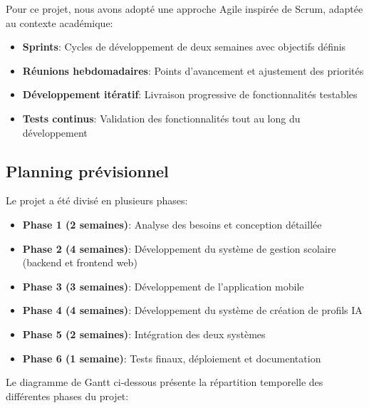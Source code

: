 Pour ce projet, nous avons adopté une approche Agile inspirée de Scrum, adaptée au contexte académique:

\begin{itemize}
  \item \textbf{Sprints}: Cycles de développement de deux semaines avec objectifs définis
  
  \item \textbf{Réunions hebdomadaires}: Points d'avancement et ajustement des priorités
  
  \item \textbf{Développement itératif}: Livraison progressive de fonctionnalités testables
  
  \item \textbf{Tests continus}: Validation des fonctionnalités tout au long du développement
\end{itemize}

\subsection{Planning prévisionnel}

Le projet a été divisé en plusieurs phases:

\begin{itemize}
  \item \textbf{Phase 1 (2 semaines)}: Analyse des besoins et conception détaillée
  
  \item \textbf{Phase 2 (4 semaines)}: Développement du système de gestion scolaire (backend et frontend web)
  
  \item \textbf{Phase 3 (3 semaines)}: Développement de l'application mobile
  
  \item \textbf{Phase 4 (4 semaines)}: Développement du système de création de profils IA
  
  \item \textbf{Phase 5 (2 semaines)}: Intégration des deux systèmes
  
  \item \textbf{Phase 6 (1 semaine)}: Tests finaux, déploiement et documentation
\end{itemize}

Le diagramme de Gantt ci-dessous présente la répartition temporelle des différentes phases du projet:

